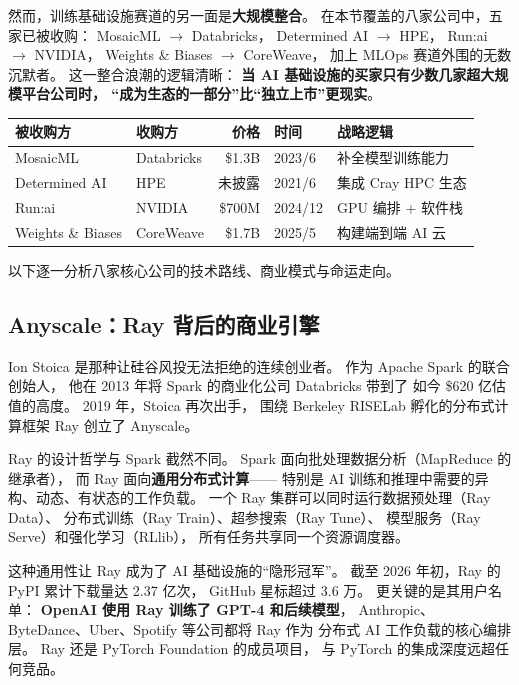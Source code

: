 然而，训练基础设施赛道的另一面是\textbf{大规模整合}。
在本节覆盖的八家公司中，五家已被收购：
MosaicML $\to$ Databricks，
Determined AI $\to$ HPE，
Run:ai $\to$ NVIDIA，
Weights \& Biases $\to$ CoreWeave，
加上 MLOps 赛道外围的无数沉默者。
这一整合浪潮的逻辑清晰：
\textbf{当 AI 基础设施的买家只有少数几家超大规模平台公司时，
``成为生态的一部分''比``独立上市''更现实}。

\begin{keybox}[训练基础设施赛道收购汇总]
\small
\begin{tabularx}{\textwidth}{@{}l l r l l@{}}
\toprule
\rowcolor{figLightGray}
\textbf{被收购方} & \textbf{收购方} & \textbf{价格} &
  \textbf{时间} & \textbf{战略逻辑} \\
\midrule
MosaicML       & Databricks  & \$1.3B  & 2023/6  & 补全模型训练能力 \\
Determined AI  & HPE         & 未披露   & 2021/6  & 集成 Cray HPC 生态 \\
Run:ai         & NVIDIA      & \$700M  & 2024/12 & GPU 编排 + 软件栈 \\
Weights \& Biases & CoreWeave & \$1.7B & 2025/5 & 构建端到端 AI 云 \\
\bottomrule
\end{tabularx}
\end{keybox}

以下逐一分析八家核心公司的技术路线、商业模式与命运走向。


\subsection{Anyscale：Ray 背后的商业引擎}

Ion Stoica 是那种让硅谷风投无法拒绝的连续创业者。
作为 Apache Spark 的联合创始人，
他在 2013 年将 Spark 的商业化公司 Databricks 带到了
如今 \$620 亿估值的高度。
2019 年，Stoica 再次出手，
围绕 Berkeley RISELab 孵化的分布式计算框架 Ray 创立了 Anyscale。

Ray 的设计哲学与 Spark 截然不同。
Spark 面向批处理数据分析（MapReduce 的继承者），
而 Ray 面向\textbf{通用分布式计算}——
特别是 AI 训练和推理中需要的异构、动态、有状态的工作负载。
一个 Ray 集群可以同时运行数据预处理（Ray Data）、
分布式训练（Ray Train）、超参搜索（Ray Tune）、
模型服务（Ray Serve）和强化学习（RLlib），
所有任务共享同一个资源调度器。

这种通用性让 Ray 成为了 AI 基础设施的``隐形冠军''。
截至 2026 年初，Ray 的 PyPI 累计下载量达 2.37 亿次，
GitHub 星标超过 3.6 万。
更关键的是其用户名单：
\textbf{OpenAI 使用 Ray 训练了 GPT-4 和后续模型}，
Anthropic、ByteDance、Uber、Spotify 等公司都将 Ray 作为
分布式 AI 工作负载的核心编排层。
Ray 还是 PyTorch Foundation 的成员项目，
与 PyTorch 的集成深度远超任何竞品。

